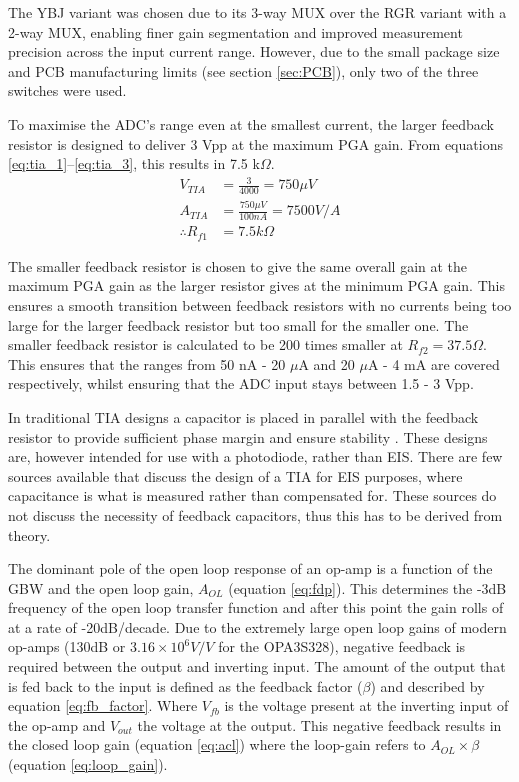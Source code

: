The YBJ variant was chosen due to its 3-way \ac{MUX} over the RGR variant with a 2-way \ac{MUX}, enabling finer gain segmentation and improved measurement precision across the input current range. However, due to the small package size and PCB manufacturing limits (see section \ref{sec:PCB}), only two of the three switches were used.

To maximise the \ac{ADC}'s range even at the smallest current, the larger feedback resistor is designed to deliver 3 Vpp at the maximum \ac{PGA} gain. From equations \ref{eq:tia_1}--\ref{eq:tia_3}, this results in 7.5 k$\Omega$.
\begin{align}
        V_{TIA} &= \frac{3}{4000} = 750 \mu V \label{eq:tia_1}\\
        A_{TIA} &= \frac{750 \mu V}{100 nA} = 7500 V/A \\
        \therefore  R_{f1} &= 7.5 k\Omega \label{eq:tia_3}
\end{align}

The smaller feedback resistor is chosen to give the same overall gain at the maximum \ac{PGA} gain as the larger resistor gives at the minimum \ac{PGA} gain. This ensures a smooth transition between feedback resistors with no currents being too large for the larger feedback resistor but too small for the smaller one. The smaller feedback resistor is calculated to be 200 times smaller at $R_{f2}=37.5 \Omega$. This ensures that the ranges from 50 nA - 20 $\mu$A and 20 $\mu$A - 4 mA are covered respectively, whilst ensuring that the \ac{ADC} input stays between 1.5 - 3 Vpp.

In traditional TIA designs a capacitor is placed in parallel with the feedback resistor to provide sufficient phase margin and ensure stability \cite{StabilizeYourTransimpedance}. These designs are, however intended for use with a photodiode, rather than \ac{EIS}. There are few sources available that discuss the design of a TIA for EIS purposes, where capacitance is what is measured rather than compensated for. These sources do not discuss the necessity of feedback capacitors, thus this has to be derived from theory.

The dominant pole of the open loop response of an op-amp is a function of the GBW and the open loop gain, $A_{OL}$ (equation \ref{eq:fdp}). This determines the -3dB frequency of the open loop transfer function and after this point the gain rolls of at a rate of -20dB/decade. Due to the extremely large open loop gains of modern op-amps (130dB or $3.16 \times 10^6 V/V$ for the OPA3S328), negative feedback is required between the output and inverting input. The amount of the output that is fed back to the input is defined as the feedback factor ($\beta$) and described by equation \ref{eq:fb_factor}. Where $V_{fb}$ is the voltage present at the inverting input of the op-amp and $V_{out}$ the voltage at the output. This negative feedback results in the closed loop gain (equation \ref{eq:acl}) where the loop-gain refers to $A_{OL}\times\beta$ (equation \ref{eq:loop_gain}).

